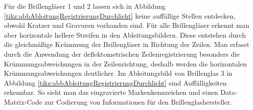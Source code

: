 \noindent
Für die Brillengläser 1 und 2 lassen sich in Abbildung \ref{tikz:abbAbleitungRegistrierungDurchlicht} keine auffällige Stellen entdecken, obwohl Kratzer und Gravuren vorhanden sind.
Für alle Brillengläser erkennt man aber horizontale hellere Streifen in den Ableitungsbildern.
Diese entstehen durch die gleichmäßige Krümmung der Brillengläser in Richtung der Zeilen.
Man erfasst durch die Anwendung der deflektometrischen Zeilenregistrierung besonders die Krüm\-mungs\-ab\-wei\-chun\-gen in der Zeilenrichtung, deshalb werden die horizontalen Krüm\-mungs\-ab\-wei\-chun\-gen deutlicher.
Im Ableitungsbild von Brillenglas 3 in Abbildung \ref{tikz:abbAbleitungRegistrierungDurchlicht} sind Auffälligkeiten erkennbar.
So sieht man das eingravierte Markenkennzeichen und einen Data-Matrix-Code zur Codierung von Informationen für den Brillenglashersteller.